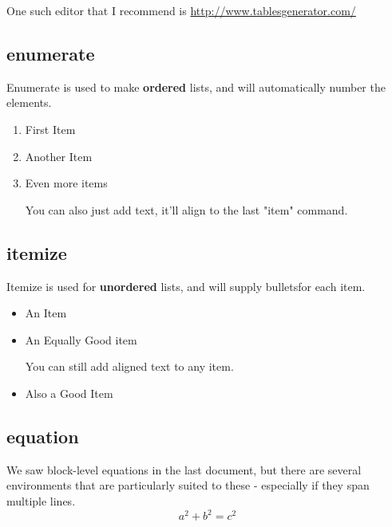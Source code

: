 \documentclass{article}
\begin{document}
        One such editor that I recommend is \url{http://www.tablesgenerator.com/}

    \subsection{enumerate}
        Enumerate is used to make \textbf{ordered} lists, and will automatically number the elements.
        
        \begin{enumerate}
          \item First Item
          \item Another Item
          \item Even more items
          
          You can also just add text, it'll align to the last "item" command.
        \end{enumerate}
    
    \subsection{itemize}
        Itemize is used for \textbf{unordered} lists, and will supply bulletsfor each item.
        
        \begin{itemize}
          \item An Item
          \item An Equally Good item
          
            You can still add aligned text to any item.
        
          \item Also a Good Item
          
        \end{itemize}

    \subsection{equation}
        We saw block-level equations in the last document, but there are several environments that are particularly suited to these - especially if they span multiple lines.
        \begin{equation}
            a^2 + b^2 = c^2
            \label{eq:pythagoras} %
        \end{equation}
        
\end{document}
